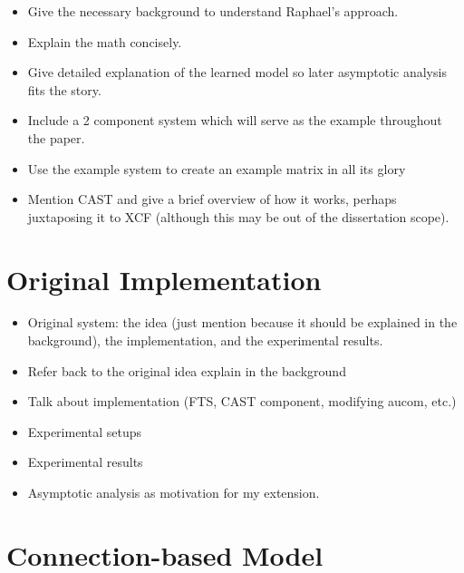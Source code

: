 \documentclass[11pt, a4paper]{report}
\begin{document}
\begin{itemize}
\item Give the necessary background to understand Raphael's approach.
\item Explain the math concisely.
\item Give detailed explanation of the learned model so later
  asymptotic analysis fits the story.
\item Include a 2 component system which will serve as the example
  throughout the paper.
\item Use the example system to create an example matrix in all its
  glory
\item Mention CAST and give a brief overview of how it works, perhaps
  juxtaposing it to XCF (although this may be out of the dissertation
  scope).
\end{itemize}



\chapter{Original Implementation}
\label{cha:orig-impl}

\begin{itemize}
\item Original system: the idea (just mention because it should be
  explained in the background), the implementation, and the
  experimental results.
\item Refer back to the original idea explain in the background
\item Talk about implementation (FTS, CAST component, modifying aucom, etc.)
\item Experimental setups
\item Experimental results
\item Asymptotic analysis as motivation for my extension.
\end{itemize}

\chapter{Connection-based Model}
\label{cha:conn-based-model}
\end{document}
